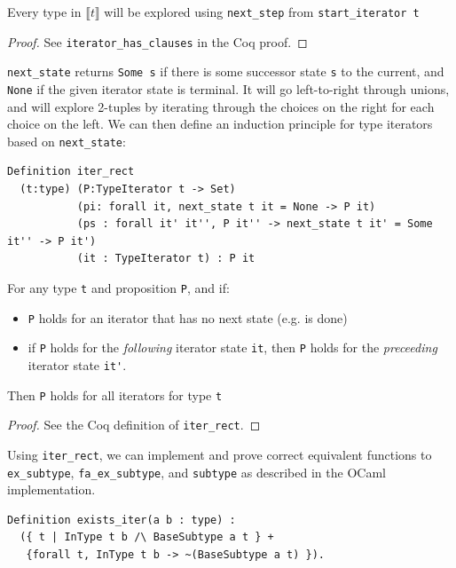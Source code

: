 \documentclass[a4paper,english]{lipics-v2019}
\newcommand{\denotes}[1]{\llbracket #1 \rrbracket}
\begin{document}
\begin{theorem}
Every type in $\denotes{t}$ will be explored using \verb|next_step| from \verb|start_iterator t| 
\end{theorem}
\begin{proof}
See \verb|iterator_has_clauses| in the Coq proof.
\end{proof}

\verb|next_state| returns \verb|Some s| if there is some successor state
\verb|s| to the current, and \verb|None| if the given iterator state is
terminal. It will go left-to-right through unions, and will explore 2-tuples
by iterating through the choices on the right for each choice on the left. We can
then define an induction principle for type iterators based on \verb|next_state|:

\begin{theorem}
\begin{small}\begin{verbatim}
Definition iter_rect
  (t:type) (P:TypeIterator t -> Set)
           (pi: forall it, next_state t it = None -> P it)
           (ps : forall it' it'', P it'' -> next_state t it' = Some it'' -> P it')
           (it : TypeIterator t) : P it  
\end{verbatim}\end{small}

For any type \verb|t| and proposition \verb|P|, and if:
\begin{itemize} 
	\item \verb|P| holds for an iterator that has no next state (e.g. is done)
	\item if \verb|P| holds for the \emph{following} iterator state \verb|it|,
	then \verb|P| holds for the \emph{preceeding} iterator state \verb|it'|.
\end{itemize}
Then \verb|P| holds for all iterators for type \verb|t|
\end{theorem}
\begin{proof}
See the Coq definition of \verb|iter_rect|.
\end{proof}

Using \verb|iter_rect|, we can implement and prove correct equivalent functions
to \verb|ex_subtype|, \verb|fa_ex_subtype|, and \verb|subtype| as described in the
OCaml implementation.

\begin{small}\begin{verbatim}
Definition exists_iter(a b : type) : 
  ({ t | InType t b /\ BaseSubtype a t } +
   {forall t, InType t b -> ~(BaseSubtype a t) }).
\end{verbatim}\end{small}
\end{document}
